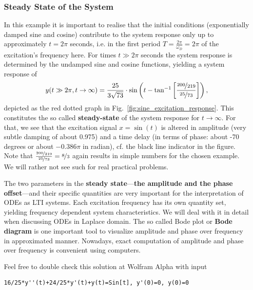 \documentclass[11pt,a4paper,DIV=12]{scrartcl}
\begin{document}
\subsubsection{Steady State of the System}
%
In this example it is important to realise that the initial conditions
(exponentially damped sine and cosine) contribute
to the system response only up to approximately $t=2\pi$
seconds, i.e. in the first period $T=\frac{2\pi}{\omega_D}=2\pi$ of the
excitation's frequency here.
%
For times $t\gg2\pi$ seconds the system response is determined by the
undamped sine and cosine functions, yielding a system response of
\begin{align}
\label{eq:steadystate_timedomain}
y(t\gg 2\pi, t\to\infty) = \frac{25}{3 \sqrt{73}}\cdot
\sin\left(t-\tan^{-1}
\left[\frac{\nicefrac{200}{219}}{\nicefrac{25}{73}}\right]\right),
\end{align}
depicted as the red dotted graph in Fig.~\ref{fig:sine_excitation_response}.
This constitutes the so called \textbf{steady-state} of the system response
for $t\to\infty$.
For that, we see that the excitation signal $x=\sin(t)$ is altered in amplitude
(very subtle damping of about 0.975) and
a time delay (in terms of phase: about -70 degrees or about $-0.386 \pi$ in
radian), cf. the black line indicator in the figure.
Note that $\frac{\nicefrac{200}{219}}{\nicefrac{25}{73}} = \nicefrac{8}{3}$ again
results in simple numbers for the chosen example. We will rather not see such
for real practical problems.

The two parameters in the
\textbf{steady state}---\textbf{the amplitude and the phase offset}---and
their specific quantities are very important for the
interpretation of ODEs as LTI systems. Each excitation frequency has its own
quantity set, yielding frequency dependent system characteristics.
We will deal with it in detail when discussing ODEs in Laplace domain.
%
The so called Bode plot or \textbf{Bode diagram} is one important tool
to visualize amplitude and phase over frequency in approximated manner.
%
Nowadays, exact computation of amplitude and phase over frequency is convenient
using computers.

Feel free to double check this solution at Wolfram Alpha with input
\begin{verbatim}
16/25*y''(t)+24/25*y'(t)+y(t)=Sin[t], y'(0)=0, y(0)=0
\end{verbatim}





\newpage
\end{document}
